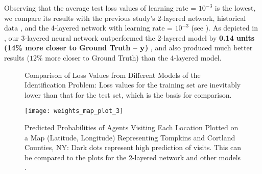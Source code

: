 Observing that the average test loss values of learning rate = $10^{-3}$ is the lowest, we compare its results with the previous study's 2-layered network, historical data \cite[Table~1]{Xue2016Avi2}, and the 4-layered network with learning rate = $10^{-3}$ (see ). As depicted in , our 3-layered neural network outperformed the 2-layered model by \textbf{0.14 units (14\% more closer to Ground Truth -- $\mathbf{y}$)} \cite[Table~1]{Xue2016Avi2}, and also produced much better results ($12\%$ more closer to Ground Truth) than the 4-layered model.
\begin{figure}[!htbp]
    \centering
    \begin{minipage}{.48\textwidth}
        \centering
        \caption[Comparison of Loss Values from Different Models of the Identification Problem]{Comparison of Loss Values from Different Models of the Identification Problem: Loss values for the training set are inevitably lower than that for the test set, which is the basis for comparison.}
        \label{fig:Comparison of Loss Values from Different Models of the Identification Problem}
    \end{minipage}\hfill
    \begin{minipage}{.48\textwidth}
        \centering
        \texttt{[image: weights\_map\_plot\_3]}
        \caption[Predicted Probabilities of Agents Visiting Each Location Plotted on a Map (Latitude, Longitude) Representing Tompkins and Cortland Counties, NY]{Predicted Probabilities of Agents Visiting Each Location Plotted on a Map (Latitude, Longitude) Representing Tompkins and Cortland Counties, NY: Dark dots represent high prediction of visits. This can be compared to the plots for the 2-layered network and other models \cite[Figure~3]{Xue2016Avi2}.}
        \label{fig:Predicted Probabilities of Agents Visiting Each Location Plotted on a Map}
    \end{minipage}
\end{figure}

